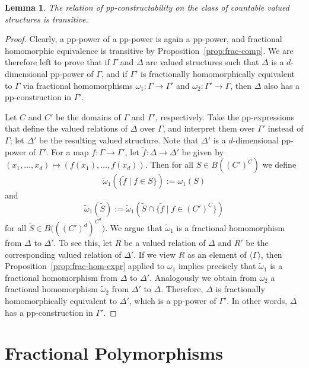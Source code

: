 \documentclass[nonacm]{acmart}
\newtheorem{lemma}[theorem]{Lemma}
\begin{document}
\begin{lemma}\label{lem:pp-trans}
The relation of pp-constructability on the class of countable valued structures is transitive. 
\end{lemma}
\begin{proof}
Clearly, a pp-power of a pp-power is again a pp-power, and fractional homomorphic equivalence is transitive by Proposition~\ref{prop:frac-comp}.
We are therefore left to prove that if $\Gamma$ and $\Delta$ are valued structures such that $\Delta$ is a $d$-dimensional pp-power of $\Gamma$,
and if $\Gamma'$ is fractionally homomorphically equivalent to $\Gamma$ via fractional homomorphisms $\omega_1 \colon \Gamma \to \Gamma'$ and $\omega_2 \colon \Gamma' \to \Gamma$, then $\Delta$ also has a  pp-construction in $\Gamma'$.  

Let $C$ and $C'$ be the domains of $\Gamma$ and $\Gamma'$, respectively. Take the pp-expressions that define the valued relations of $\Delta$ over $\Gamma$, and interpret them over $\Gamma'$ instead of $\Gamma$;
let $\Delta'$ be the resulting valued structure. Note that $\Delta'$ is a $d$-dimensional pp-power of $\Gamma'$.
For a map $f \colon \Gamma \to \Gamma'$, let $\tilde f \colon \Delta \to \Delta'$ be given by 
 $(x_1,\dots,x_{d}) \mapsto (f(x_1),\dots,f(x_{d}))$. 
Then for all $S \in B((C')^{C})$
we define 
$$\tilde \omega_1 (\{\tilde f \mid f \in S\}) := \omega_1(S)$$
and 
\[\tilde \omega_1(\tilde S):=\tilde \omega_1 (\tilde{S} \cap \{\tilde f \mid f \in (C')^C\})\]
for all $\tilde S \in B \big(((C')^d)^{C^d} \big)$.
We argue that $\tilde \omega_1$ is a fractional homomorphism from $\Delta$ to $\Delta'$. To see this, let $R$ be a valued relation of $\Delta$ and $R'$ be the corresponding valued relation of $\Delta'$. If we view $R$ as an element of $\langle \Gamma \rangle$, then Proposition~\ref{prop:frac-hom-expr} applied to $\omega_1$ implies precisely that $\tilde \omega_1$ is a fractional homomorphism from $\Delta$ to $\Delta'$. 
Analogously we obtain from $\omega_2$ a fractional homomorphism $\tilde \omega_2$ from $\Delta'$ to $\Delta$. Therefore, $\Delta$ is fractionally homomorphically equivalent to $\Delta'$, which is a pp-power of $\Gamma'$. In other words, $\Delta$ has a pp-construction in $\Gamma'$.
\end{proof}


\section{Fractional Polymorphisms}
\end{document}
